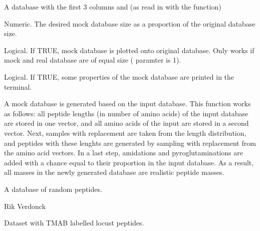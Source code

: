 \documentclass[letterpaper]{book}
\begin{document}
%
\begin{Arguments}
\begin{ldescription}
\item[\code{db}] A database with the first 3 columns  and  (as read in with the  function)

\item[\code{size}] Numeric. The desired mock database size as a proportion of the original database size.

\item[\code{plot}] Logical. If TRUE, mock database is plotted onto original database. Only works if mock and real database are of equal size ( paramter is 1).

\item[\code{verbose}] Logical. If TRUE, some properties of the mock database are printed in the terminal.
\end{ldescription}
\end{Arguments}
%
\begin{Details}\relax
A mock database is generated based on the input database. This function works as follows: all peptide lengths (in number of amino acids) of the input database are stored in one vector, and all amino acids of the input are stored in a second vector. Next, samples with replacement are taken from the length distribution, and peptides with these lenghts are generated by sampling with replacement from the amino acid vectors. In a last step, amidations and pyroglutaminations are added with a chance equal to their proportion in the input database. As a result, all masses in the newly generated database are realistic peptide masses.
\end{Details}
%
\begin{Value}
A database of random peptides.
\end{Value}
%
\begin{Author}\relax
Rik Verdonck
\end{Author}
%
\begin{SeeAlso}\relax
{}
\end{SeeAlso}
%
\begin{Description}\relax
Dataset with TMAB labelled locust peptides.
\end{Description}
\end{document}
